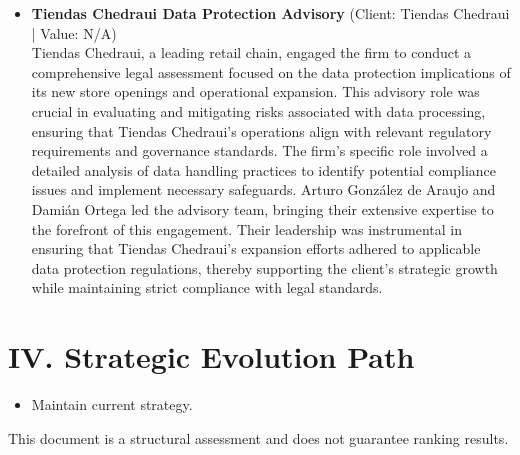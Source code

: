 \documentclass[11pt]{article}
\begin{document}
\begin{itemize}
\item \textbf{Tiendas Chedraui Data Protection Advisory} (Client: Tiendas Chedraui | Value: N/A)\\ Tiendas Chedraui, a leading retail chain, engaged the firm to conduct a comprehensive legal assessment focused on the data protection implications of its new store openings and operational expansion. This advisory role was crucial in evaluating and mitigating risks associated with data processing, ensuring that Tiendas Chedraui's operations align with relevant regulatory requirements and governance standards. The firm’s specific role involved a detailed analysis of data handling practices to identify potential compliance issues and implement necessary safeguards. Arturo González de Araujo and Damián Ortega led the advisory team, bringing their extensive expertise to the forefront of this engagement. Their leadership was instrumental in ensuring that Tiendas Chedraui's expansion efforts adhered to applicable data protection regulations, thereby supporting the client's strategic growth while maintaining strict compliance with legal standards.

\end{itemize}

\section*{IV. Strategic Evolution Path}
\begin{itemize}
\item Maintain current strategy.
\end{itemize}

\vfill
\centering
\small{This document is a structural assessment and does not guarantee ranking results.}
\end{document}
